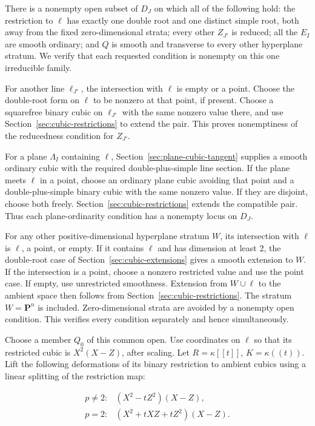 \documentclass[11pt]{article}
\begin{document}
There is a nonempty open subset of \(D_J\) on which all of the following hold: the restriction to \(\ell\) has exactly one double root and one distinct simple root, both away from the fixed zero-dimensional strata; every other \(Z_{J'}\) is reduced; all the \(E_I\) are smooth ordinary; and \(Q\) is smooth and transverse to every other hyperplane stratum. We verify that each requested condition is nonempty on this one irreducible family.

For another line \(\ell_{J'}\), the intersection with \(\ell\) is empty or a point. Choose the double-root form on \(\ell\) to be nonzero at that point, if present. Choose a squarefree binary cubic on \(\ell_{J'}\) with the same nonzero value there, and use Section~\ref{sec:cubic-restrictions} to extend the pair. This proves nonemptiness of the reducedness condition for \(Z_{J'}\).

For a plane \(\Lambda_I\) containing \(\ell\), Section~\ref{sec:plane-cubic-tangent} supplies a smooth ordinary cubic with the required double-plus-simple line section. If the plane meets \(\ell\) in a point, choose an ordinary plane cubic avoiding that point and a double-plus-simple binary cubic with the same nonzero value. If they are disjoint, choose both freely. Section~\ref{sec:cubic-restrictions} extends the compatible pair. Thus each plane-ordinarity condition has a nonempty locus on \(D_J\).

For any other positive-dimensional hyperplane stratum \(W\), its intersection with \(\ell\) is \(\ell\), a point, or empty. If it contains \(\ell\) and has dimension at least 2, the double-root case of Section~\ref{sec:cubic-extensions} gives a smooth extension to \(W\). If the intersection is a point, choose a nonzero restricted value and use the point case. If empty, use unrestricted smoothness. Extension from \(W\cup\ell\) to the ambient space then follows from Section~\ref{sec:cubic-restrictions}. The stratum \(W=\mathbf P^n\) is included. Zero-dimensional strata are avoided by a nonempty open condition. This verifies every condition separately and hence simultaneously.

Choose a member \(Q_0\) of this common open. Use coordinates on \(\ell\) so that its restricted cubic is \(X^2(X-Z)\), after scaling. Let \(R=\kappa[[t]]\), \(K=\kappa((t))\). Lift the following deformations of its binary restriction to ambient cubics using a linear splitting of the restriction map:

\begin{equation}
\begin{array}{ll}
p\ne2:&(X^2-tZ^2)(X-Z),\\[2mm]
p=2:&(X^2+tXZ+tZ^2)(X-Z).
\end{array}
\label{eq:cubic-4-1}
\end{equation}
\end{document}

